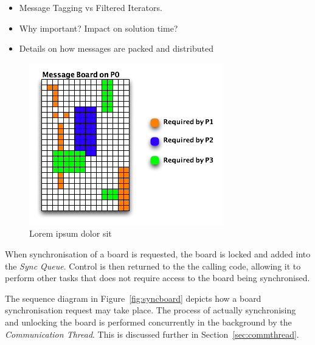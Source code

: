 \begin{itemize}
\item Message Tagging vs Filtered Iterators.
\item Why important? Impact on solution time?
\item Details on how messages are packed and distributed
\end{itemize} 

\begin{figure}[h]
 \centering
  \includegraphics[scale=0.70]{taggedboard.png}
 \caption{Lorem ipsum dolor sit}
 \label{fig:taggedboard}
\end{figure}

When synchronisation of a board is requested, the board is locked and added into the \textit{Sync Queue}. Control is then returned to the the calling code, allowing it to perform other tasks that does not require access to the board being synchronised. 

The sequence diagram in  Figure~\ref{fig:syncboard} depicts how a board synchronisation request may take place. The process of actually synchronising and unlocking the board is performed concurrently in the background by the \textit{Communication Thread}. This is discussed further in Section~\ref{sec:commthread}.

